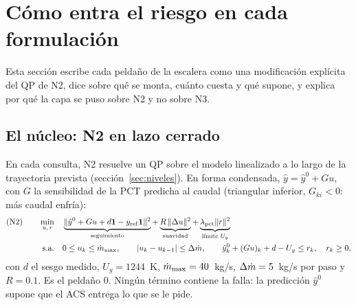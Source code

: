 \section{Cómo entra el riesgo en cada formulación}\label{sec:riesgo-como-entra}
Esta sección escribe cada peldaño de la escalera como una modificación explícita del QP de N2,
dice sobre qué se monta, cuánto cuesta y qué supone, y explica por qué la capa se puso sobre N2 y
no sobre N3.

\subsection{El núcleo: N2 en lazo cerrado}
En cada consulta, N2 resuelve un QP sobre el modelo linealizado a lo largo de la trayectoria
prevista (sección~\ref{sec:niveles}). En forma condensada, $\hat y=\hat y^0+Gu$, con $G$ la
sensibilidad de la PCT predicha al caudal (triangular inferior, $G_{ki}<0$: más caudal enfría):
\begin{align*}
\text{(N2)}\qquad\min_{u,\,r}\quad & \underbrace{\|\hat y^0+Gu+d\mathbf 1-y_{\rm ref}\mathbf 1\|^2}_{\text{seguimiento}}
+\underbrace{R\,\|\Delta u\|^2}_{\text{suavidad}}+\underbrace{\lambda_{\rm pct}\|r\|^2}_{\text{límite }U_y}\\
\text{s.a.}\quad & 0\le u_k\le\dot m_{\max},\qquad |u_k-u_{k-1}|\le\Delta\dot m,\qquad
\hat y^0_k+(Gu)_k+d-U_y\le r_k,\quad r_k\ge0,
\end{align*}
con $d$ el sesgo medido, $U_y=1244$~K, $\dot m_{\max}=40$~kg/s, $\Delta\dot m=5$~kg/s por paso y
$R=0.1$. Es el peldaño 0. Ningún término contiene la falla: la predicción $\hat y^0$ supone que
el ACS entrega lo que se le pide.


